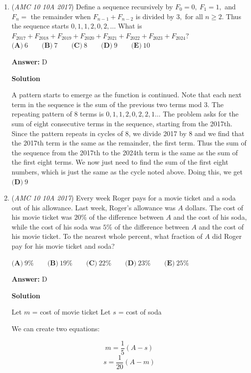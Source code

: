 \begin{enumerate}
 


	\item (\textit{AMC 10 10A 2017}) Define a sequence recursively by $F_{0}=0,~F_{1}=1,$ and $F_{n}=$ the remainder when $F_{n-1}+F_{n-2}$ is divided by $3,$ for all $n\geq 2.$ Thus the sequence starts $0,1,1,2,0,2,\ldots$ What is $F_{2017}+F_{2018}+F_{2019}+F_{2020}+F_{2021}+F_{2022}+F_{2023}+F_{2024}?$
$\textbf{(A)}\ 6\qquad\textbf{(B)}\ 7\qquad\textbf{(C)}\ 8\qquad\textbf{(D)}\ 9\qquad\textbf{(E)}\ 10$

 \textbf{Answer: }D



\textbf{Solution}

A pattern starts to emerge as the function is continued. Note that each next term in the sequence is the sum of the previous two terms mod 3. The repeating pattern of 8 terms is $0,1,1,2,0,2,2,1\ldots$ The problem asks for the sum of eight consecutive terms in the sequence, starting from the 2017th. Since the pattern repeats in cycles of 8, we divide 2017 by 8 and we find that the 2017th term is the same as the remainder, the first term. Thus the sum of the sequence from the 2017th to the 2024th term is the same as the sum of the first eight terms. We now just need to find the sum of the first eight numbers, which is just the same as the cycle noted above. Doing this, we get $\boxed{\textbf{(D)}\ 9}$



	\item (\textit{AMC 10 10A 2017}) Every week Roger pays for a movie ticket and a soda out of his allowance. Last week, Roger's allowance was $A$ dollars. The cost of his movie ticket was $20\%$ of the difference between $A$ and the cost of his soda, while the cost of his soda was $5\%$ of the difference between $A$ and the cost of his movie ticket. To the nearest whole percent, what fraction of $A$ did Roger pay for his movie ticket and soda?


 $\textbf{(A)}\ 9\%\qquad\textbf{(B)}\ 19\%\qquad\textbf{(C)}\ 22\%\qquad\textbf{(D)}\ 23\%\qquad\textbf{(E)}\ 25\%$

 \textbf{Answer: }D



\textbf{Solution}

Let $m$ = cost of movie ticket
Let $s$  = cost of soda

 We can create two equations:

 
 \[m = \frac{1}{5}(A - s)\]
 \[s  = \frac{1}{20}(A - m)\]


\end{enumerate}
